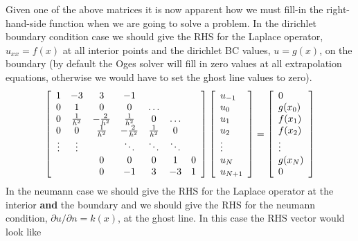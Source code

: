 Given one of the above matrices it is now apparent how we must fill-in the right-hand-side function
when we are going to solve a problem. In the dirichlet boundary condition case we should give the RHS for
the Laplace operator, $u_{xx}=f(x)$ at all interior points and the 
dirichlet BC values, $u = g(x)$, on the boundary
(by default the Oges solver will fill in zero values at all extrapolation
equations, otherwise we would have to set the ghost line values to zero). 
\begin{equation*}
   \left[\begin{array}{ccccccc}
         1    & -3   &  3   & -1   &      &      &    \\
           0  &  1   &  0   & 0    &\ldots&      &   \\
         0    & {1\over h^2} & -{2\over h^2} & {1\over h^2} &  0   &\ldots&   \\
         0    &  0   & {1\over h^2} & -{2\over h^2} & {1\over h^2} &  0   &   \\
        \vdots&\vdots&      &\ddots&\ddots&\ddots&    \\
              &      &  0   &  0   &  0   &  1   &  0   \\
              &      &  0   & -1   &  3   & -3   &  1   
    \end{array} \right]
   \left[\begin{array}{l}
    u_{-1} \\ u_0 \\ u_1 \\ u_2 \\ \vdots \\ u_N \\ u_{N+1}
   \end{array}\right]
   = 
   \left[\begin{array}{l}
    0 \\ g(x_0) \\ f(x_1) \\ f(x_2) \\ \vdots \\ g(x_N) \\ 0
   \end{array}\right]
\end{equation*}
In the neumann case we should
give the RHS for the Laplace operator at the interior {\bf and} the boundary and we should give the RHS
for the neumann condition,  $\partial u / \partial n = k(x)$,
at the ghost line. In this case the RHS vector would look like
